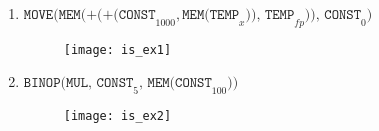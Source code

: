 \begin{enumerate}
	\item $\texttt{MOVE(MEM(+(+(CONST}_{1000}, \texttt{MEM(TEMP}_x\texttt{)), TEMP}_{fp}\texttt{)), CONST}_0\texttt{)}$
	\begin{figure}
		\texttt{[image: is\_ex1]}
	\end{figure}
	\item $\texttt{BINOP(MUL, CONST}_{5}\texttt{, MEM(CONST}_{100}\texttt{))}$
	\begin{figure}
		\texttt{[image: is\_ex2]}
	\end{figure}
\end{enumerate}